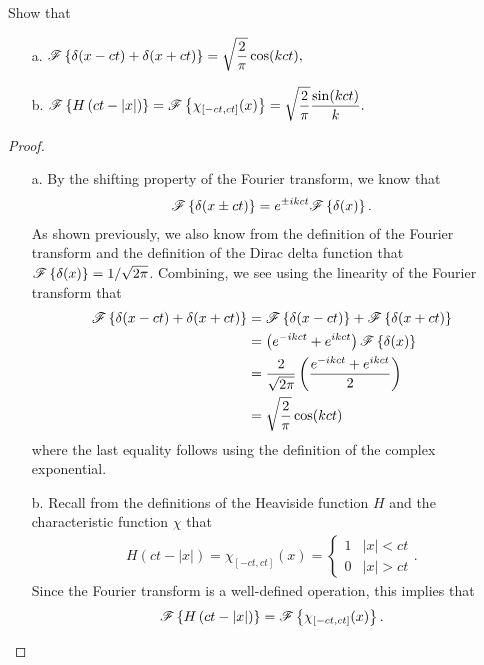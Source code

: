 \begin{problem}{2.2}
  Show that
  \begin{enumerate}
    \item [a.] $\displaystyle \mathscr{F}\left\{ { \delta(x - ct) + \delta(x + ct) } \right\} = \sqrt{ \frac{ 2 }{ \pi} } \cos(kct),$
    \item [b.] $\displaystyle \mathscr{F}\left\{ { H \left( ct - |x| \right) } \right\} = \mathscr{F}\left\{ { \chi_{[-ct, ct]}(x) } \right\}
      = \sqrt{ \frac{ 2 }{ \pi} } \frac{ \sin(kct) }{ k }.$
  \end{enumerate}
\end{problem}

\begin{proof}
  \begin{enumerate}
    \item[a.] By the shifting property of the Fourier transform, we know that
      \begin{align*}
        \mathscr{F}\left\{ {\delta(x \pm ct)} \right\} = e^{\pm ik ct}\mathscr{F}\left\{ {\delta(x)} \right\}.
      \end{align*}
      As shown previously, we also know from the definition of the Fourier transform
      and the definition of the Dirac delta function that $\mathscr{F}\left\{ {\delta(x)} \right\} = 1/\sqrt{2\pi}$. Combining,
      we see using the linearity of the Fourier transform that
      \begin{align*}
        \mathscr{F}\left\{ { \delta(x - ct) + \delta(x + ct) } \right\} &= \mathscr{F}\left\{ { \delta(x - ct)} \right\} + \mathscr{F}\left\{ {\delta(x + ct) } \right\} \\
        &= \left(e^{-ik ct} + e^{ikct} \right)\mathscr{F}\left\{ {\delta(x)} \right\} \\
        &= \frac{2}{\sqrt{2\pi}} \left(\frac{e^{-ik ct} + e^{ikct}}{2}\right) \\
        &= \sqrt{\frac{2}{\pi}}\cos(kct)
      \end{align*}
      where the last equality follows using the definition of the complex exponential.
    \item[b.] Recall from the definitions of the Heaviside function $H$ and
      the characteristic function $\chi$ that
      \begin{align*}
        H(ct - |x|) = \chi_{[-ct, ct]}(x) =
        \begin{cases}
          1 & |x| < ct \\
          0 & |x| > ct
        \end{cases}.
      \end{align*}
      Since the Fourier transform is a well-defined operation, this implies that
      $$\displaystyle \mathscr{F}\left\{ { H \left( ct - |x| \right) } \right\} = \mathscr{F}\left\{ { \chi_{[-ct, ct]}(x) } \right\}.$$


\end{enumerate}
\end{proof}
